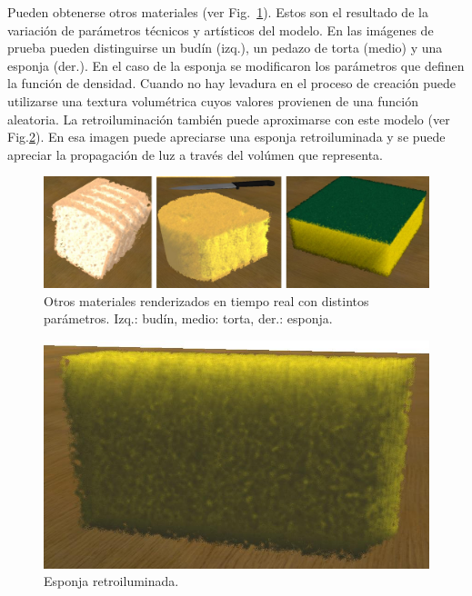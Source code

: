 \documentclass[oneside,a4paper,spanish,links]{amca}
\begin{document}
Pueden obtenerse otros materiales (ver Fig.~\ref{fg:fig6}). Estos son
el resultado de la variación de parámetros técnicos y artísticos del
modelo. En las imágenes de prueba pueden distinguirse un budín (izq.), un
pedazo de torta (medio) y una esponja (der.). En el caso de la esponja
se modificaron los parámetros que definen la función de
densidad. Cuando no hay levadura en el proceso de creación puede
utilizarse una textura volumétrica cuyos valores provienen de una
función aleatoria. La retroiluminación también puede aproximarse con
este modelo (ver Fig.\ref{fg:fig7}). En esa imagen puede apreciarse
una esponja retroiluminada y se puede apreciar la propagación de luz a
través del volúmen que representa.

\begin{figure}[htb!]
  \centerline{\includegraphics[scale=0.3]{fig6}}
  \caption{Otros materiales renderizados en tiempo real con distintos parámetros. Izq.: budín, medio: torta, der.: esponja. }
  \label{fg:fig6}
\end{figure}



\begin{figure}[htb!]
  \centerline{\includegraphics[scale=0.25]{fig7}}
  \caption{Esponja retroiluminada.}
  \label{fg:fig7}
\end{figure}
\end{document}
